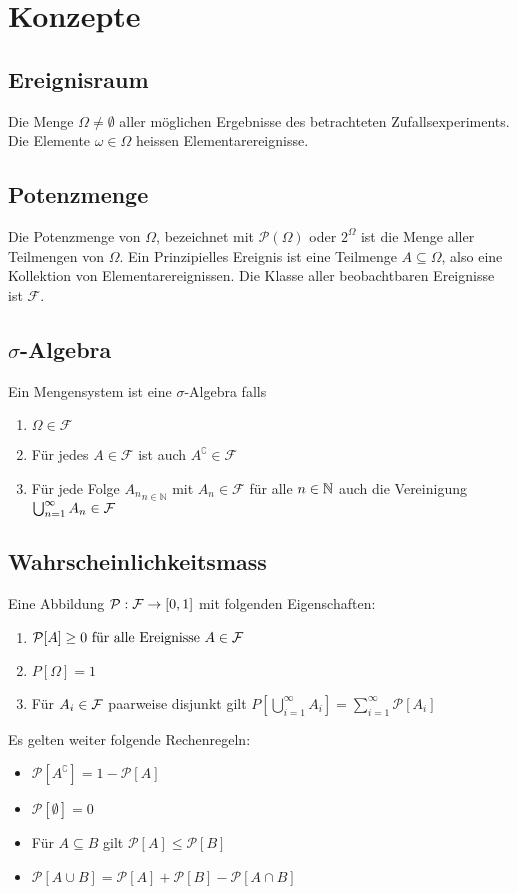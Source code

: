 

{\section{Konzepte}}
\subsection*{Ereignisraum}
Die Menge $\Omega \neq \emptyset$ aller möglichen Ergebnisse des betrachteten
Zufallsexperiments. Die Elemente $\omega \in \Omega$ heissen
Elementarereignisse.
\subsection*{Potenzmenge}
Die Potenzmenge von $\Omega$, bezeichnet mit $\mathcal{P} (\Omega)$ oder
$2^\Omega$ ist die Menge aller Teilmengen von $\Omega$. Ein Prinzipielles
Ereignis ist eine Teilmenge $A \subseteq \Omega$, also eine Kollektion von
Elementarereignissen. Die Klasse aller beobachtbaren Ereignisse ist
$\mathcal{F}$.
\subsection*{$\sigma$-Algebra}
Ein Mengensystem ist eine $\sigma$-Algebra falls
\begin{enumerate}[label=  (\arabic*)]
  \item $\Omega \in \mathcal{F}$
  \item Für jedes $A \in \mathcal{F}$ ist auch $A^\complement \in \mathcal{F}$
  \item Für jede Folge ${A_n}_{n \in \mathbb{N}}$ mit $A_n \in \mathcal{F}$ für alle $n
          \in \mathbb{N}$ auch die Vereinigung $\bigcup_{n = 1}^\infty A_n \in \mathcal{F}$
\end{enumerate}
\subsection*{Wahrscheinlichkeitsmass}
Eine Abbildung $\mathcal{P}: \mathcal{F} \to [0, 1]$ mit folgenden Eigenschaften:
\begin{enumerate}[label= (\arabic*)]
  \item $\mathcal{P}[A] \geq 0 \text{ für alle Ereignisse } A \in \mathcal{F}$
  \item $P[\Omega] = 1$
  \item Für $A_i \in \mathcal{F}$ paarweise disjunkt gilt $P[\bigcup_{i = 1}^\infty A_i] =
          \sum_{i = 1}^\infty \mathcal{P}[A_i]$
\end{enumerate}
Es gelten weiter folgende Rechenregeln:
\begin{itemize}
  \item $\mathcal{P}[A^\complement] = 1 - \mathcal{P}[A]$
  \item $\mathcal{P}[\emptyset] = 0$
  \item Für $A \subseteq B$ gilt $\mathcal{P}[A] \leq \mathcal{P}[B]$
  \item $\mathcal{P}[A \cup B] = \mathcal{P}[A] + \mathcal{P}[B] - \mathcal{P}[A \cap B]$
\end{itemize}
